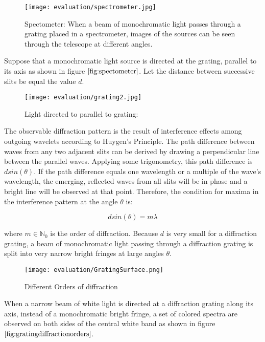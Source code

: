 \begin{figure}[H]
  \centering
  \texttt{[image: evaluation/spectrometer.jpg]}
  \caption{Spectometer: When a beam of monochromatic light passes through a grating placed in a spectrometer, images of the sources can be seen through the telescope at different angles.}
\label{fig:spectometer}
\end{figure}

Suppose that a monochromatic light source is directed at the grating, parallel to its axis as shown in figure $\ref{fig:spectometer}$. Let the distance between successive slits be equal the value $d$.

\begin{figure}[H]
  \centering
  \texttt{[image: evaluation/grating2.jpg]}
  \caption{Light directed to parallel to grating:}
  \label{fig:lighthitsgrating}
\end{figure}

The observable diffraction pattern is the result of interference effects among outgoing wavelets according to Huygen's Principle. The path difference between waves from any two adjacent slits can be derived by drawing a perpendicular line between the parallel waves. Applying some trigonometry, this path difference is $d sin(\theta)$. If the path difference equals one wavelength or a multiple of the wave's wavelength, the emerging, reflected waves from all slits will be in phase and a bright line will be observed at that point. Therefore, the condition for maxima in the interference pattern at the angle $\theta$ is: 

\begin{equation}
 d sin(\theta) = m \lambda 
\label{eq:simplegratingequation}
\end{equation}

where $m \in \mathds{N}_0$ is the order of diffraction. Because $d$ is very small for a diffraction grating, a beam of monochromatic light passing through a diffraction grating is split into very narrow bright fringes at large angles $\theta$.

\begin{figure}[H]
  \centering
  \texttt{[image: evaluation/GratingSurface.png]}
  \caption{Different Orders of diffraction}
\label{fig:gratingdiffractionorders}
\end{figure}

When a narrow beam of white light is directed at a diffraction grating along its axis, instead of a monochromatic bright fringe, a set of colored spectra are observed on both sides of the central white band as shown in figure $\ref{fig:gratingdiffractionorders}$.

